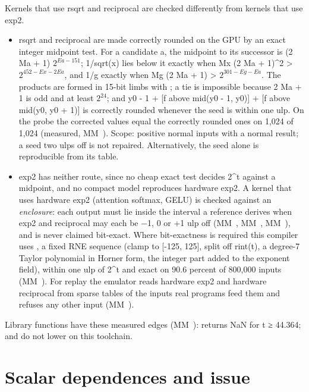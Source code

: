 Kernels that use rsqrt and reciprocal are checked differently from kernels that use exp2.

\begin{itemize}
\item rsqrt and reciprocal are made correctly rounded on the GPU by an exact integer midpoint test. For a candidate a, the
  midpoint to its successor is (2 Ma + 1) $2^{Ea - 151}$; 1/sqrt(x) lies below it exactly when
  Mx (2 Ma + 1)\^{}2 > $2^{452 - Ex - 2 Ea}$, and 1/g exactly when Mg (2 Ma + 1) > $2^{301 - Eg - Ea}$. The products are formed in
  15-bit limbs with ; a tie is impossible because 2 Ma + 1 is odd and at least $2^{24}$; and
  y0 - 1 + {[}f above mid(y0 - 1, y0){]} + {[}f above mid(y0, y0 + 1){]} is correctly rounded whenever the seed is within one ulp.
  On the probe the corrected values equal the correctly rounded ones on 1,024 of 1,024 (measured, MM~). Scope:
  positive normal inputs with a normal result; a seed two ulps off is not repaired. Alternatively, the seed alone is
  reproducible from its table.
\item exp2 has neither route, since no cheap exact test decides 2\^{}t against a midpoint, and no compact model reproduces hardware
  exp2. A kernel that uses hardware exp2 (attention softmax, GELU) is checked against an \emph{enclosure}: each output must
  lie inside the interval a reference derives when exp2 and reciprocal may each be −1, 0 or +1 ulp off (MM~,
  MM~, MM~), and is never claimed bit-exact. Where bit-exactness is required this compiler uses ,
  a fixed RNE sequence (clamp to {[}-125, 125{]}, split off rint(t), a degree-7 Taylor polynomial in Horner form, the integer
  part added to the exponent field), within one ulp of 2\^{}t and exact on 90.6 percent of 800,000 inputs (MM~). For
  replay the emulator reads hardware exp2 and hardware reciprocal from sparse tables of the inputs real programs feed them and refuses any
  other input (MM~).
\end{itemize}

Library functions have these measured edges (MM~):  returns NaN for t ≥ 44.364;  and  do not
lower on this toolchain.

\section{Scalar dependences and issue}\label{sec:dependences-issue-scalar}

